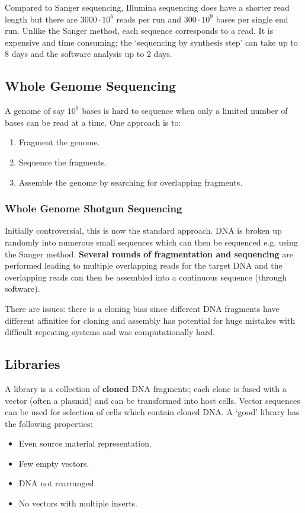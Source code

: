 \documentclass[a4paper]{article}
\newcommand{\ix}[1]{%
  \leavevmode %
  \marginpar{\small\emph{#1}}%
}
\begin{document}
Compared to Sanger sequencing, Illumina sequencing does have a shorter read length but there are $3000\cdot 10^6$ reads per run and $300\cdot 10^9$ bases per single end run. Unlike the Sanger method, each sequence corresponds to a read. It is expensive and time consuming; the `sequencing by synthesis step' can take up to 8 days and the software analysis up to 2 days.

\subsection{Whole Genome Sequencing}
A genome of say $10^9$ bases is hard to sequence when only a limited number of bases can be read at a time. One approach is to:
\begin{enumerate}
\item Fragment the genome.
\item Sequence the fragments.
\item Assemble the genome by searching for overlapping fragments.
\end{enumerate}

\subsubsection*{Whole Genome Shotgun Sequencing}
Initially controversial, this is now the standard approach.\ix{Shotgun Sequencing} DNA is broken up randomly into numerous small sequences which can then be sequenced e.g. using the Sanger method. \textbf{Several rounds of fragmentation and sequencing} are performed leading to multiple overlapping reads for the target DNA and the overlapping reads can then be assembled into a continuous sequence (through software).

There are issues:\ix{Problems?} there is a cloning bias since different DNA fragments have different affinities for cloning and assembly has potential for huge mistakes with difficult repeating systems and was computationally hard.

\subsection{Libraries}
A\ix{Library} library is a collection of \textbf{cloned} DNA fragments; each clone is fused with a vector (often a plasmid) and can be transformed into host cells. Vector sequences can be used for selection of cells which contain cloned DNA. A `good' library has the following properties:
\begin{itemize}
\item Even source material representation.
\item Few empty vectors.
\item DNA not rearranged.
\item No vectors with multiple inserts.
\end{itemize}
\end{document}
